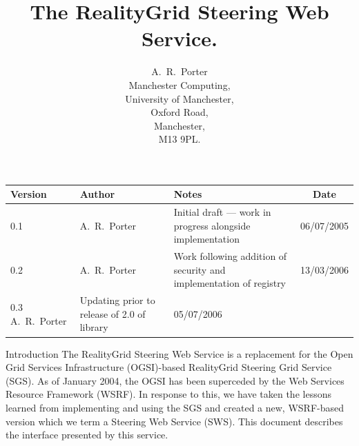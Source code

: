 \documentclass[a4paper]{article}
\begin{document}
\title{The RealityGrid Steering Web Service.}

\author{A.~R.~Porter \\
Manchester Computing,\\University of Manchester,\\Oxford Road,\\
Manchester,\\M13 9PL.}


\maketitle

\begin{table}
\begin{center}
\begin{tabular}{l|l|p{5cm}|c}
\hline\hline
Version & Author & Notes & Date \\
\hline
0.1 & A.~R.~Porter & Initial draft --- work in progress alongside implementation & 06/07/2005\\
0.2 & A.~R.~Porter & Work following addition of security and implementation of registry & 13/03/2006\\
0.3 A.~R.~Porter & Updating prior to release of 2.0 of library & 05/07/2006\\
\hline\hline
\end{tabular}
\end{center}
\end{table}

\pagebreak

\tableofcontents

\pagebreak

\begin{section}{Introduction}
The RealityGrid Steering Web Service is a replacement for the Open
Grid Services Infrastructure (OGSI)-based RealityGrid Steering Grid
Service (SGS).  As of January 2004, the OGSI has been superceded by
the Web Services Resource Framework (WSRF).  In response to this, we
have taken the lessons learned from implementing and using the SGS and
created a new, WSRF-based version which we term a Steering Web Service
(SWS).  This document describes the interface presented by this
service.
\end{section}

\end{document}
